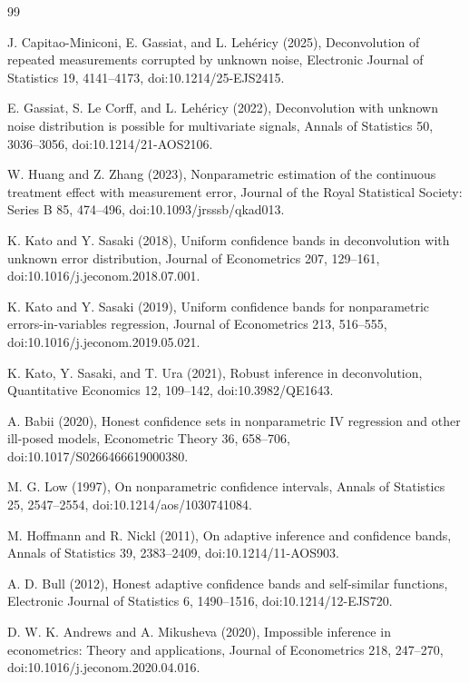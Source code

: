 \documentclass{article}
\begin{document}
\begin{thebibliography}{99}

   J. Capitao-Miniconi, E. Gassiat, and L. Lehéricy (2025), Deconvolution of repeated measurements corrupted by unknown noise, Electronic Journal of Statistics 19, 4141--4173, doi:10.1214/25-EJS2415.

   E. Gassiat, S. Le Corff, and L. Lehéricy (2022), Deconvolution with unknown noise distribution is possible for multivariate signals, Annals of Statistics 50, 3036--3056, doi:10.1214/21-AOS2106.

   W. Huang and Z. Zhang (2023), Nonparametric estimation of the continuous treatment effect with measurement error, Journal of the Royal Statistical Society: Series B 85, 474--496, doi:10.1093/jrsssb/qkad013.

   K. Kato and Y. Sasaki (2018), Uniform confidence bands in deconvolution with unknown error distribution, Journal of Econometrics 207, 129--161, doi:10.1016/j.jeconom.2018.07.001.

   K. Kato and Y. Sasaki (2019), Uniform confidence bands for nonparametric errors-in-variables regression, Journal of Econometrics 213, 516--555, doi:10.1016/j.jeconom.2019.05.021.

   K. Kato, Y. Sasaki, and T. Ura (2021), Robust inference in deconvolution, Quantitative Economics 12, 109--142, doi:10.3982/QE1643.

   A. Babii (2020), Honest confidence sets in nonparametric IV regression and other ill-posed models, Econometric Theory 36, 658--706, doi:10.1017/S0266466619000380.

   M. G. Low (1997), On nonparametric confidence intervals, Annals of Statistics 25, 2547--2554, doi:10.1214/aos/1030741084.

   M. Hoffmann and R. Nickl (2011), On adaptive inference and confidence bands, Annals of Statistics 39, 2383--2409, doi:10.1214/11-AOS903.

   A. D. Bull (2012), Honest adaptive confidence bands and self-similar functions, Electronic Journal of Statistics 6, 1490--1516, doi:10.1214/12-EJS720.

   D. W. K. Andrews and A. Mikusheva (2020), Impossible inference in econometrics: Theory and applications, Journal of Econometrics 218, 247--270, doi:10.1016/j.jeconom.2020.04.016.

\end{thebibliography}
\end{document}
